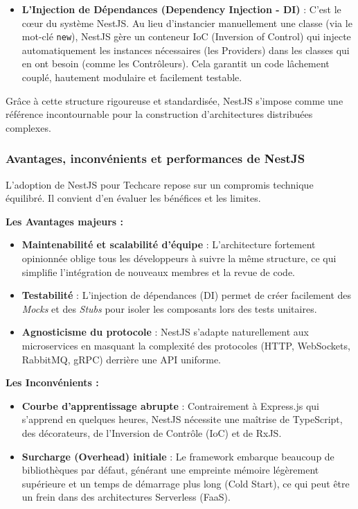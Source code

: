 \begin{itemize}
    \item \textbf{L'Injection de Dépendances (Dependency Injection - DI)} : C'est le cœur du système NestJS. Au lieu d'instancier manuellement une classe (via le mot-clé \texttt{new}), NestJS gère un conteneur IoC (Inversion of Control) qui injecte automatiquement les instances nécessaires (les Providers) dans les classes qui en ont besoin (comme les Contrôleurs). Cela garantit un code lâchement couplé, hautement modulaire et facilement testable.
\end{itemize}

Grâce à cette structure rigoureuse et standardisée, NestJS s'impose comme une référence incontournable pour la construction d'architectures distribuées complexes.

\subsubsection{Avantages, inconvénients et performances de NestJS}

L'adoption de NestJS pour Techcare repose sur un compromis technique équilibré. Il convient d'en évaluer les bénéfices et les limites.

\textbf{Les Avantages majeurs :}
\begin{itemize}
    \item \textbf{Maintenabilité et scalabilité d'équipe} : L'architecture fortement opinionnée oblige tous les développeurs à suivre la même structure, ce qui simplifie l'intégration de nouveaux membres et la revue de code.
    \item \textbf{Testabilité} : L'injection de dépendances (DI) permet de créer facilement des \textit{Mocks} et des \textit{Stubs} pour isoler les composants lors des tests unitaires.
    \item \textbf{Agnosticisme du protocole} : NestJS s'adapte naturellement aux microservices en masquant la complexité des protocoles (HTTP, WebSockets, RabbitMQ, gRPC) derrière une API uniforme.
\end{itemize}

\textbf{Les Inconvénients :}
\begin{itemize}
    \item \textbf{Courbe d'apprentissage abrupte} : Contrairement à Express.js qui s'apprend en quelques heures, NestJS nécessite une maîtrise de TypeScript, des décorateurs, de l'Inversion de Contrôle (IoC) et de RxJS.
    \item \textbf{Surcharge (Overhead) initiale} : Le framework embarque beaucoup de bibliothèques par défaut, générant une empreinte mémoire légèrement supérieure et un temps de démarrage plus long (Cold Start), ce qui peut être un frein dans des architectures Serverless (FaaS).
\end{itemize}

